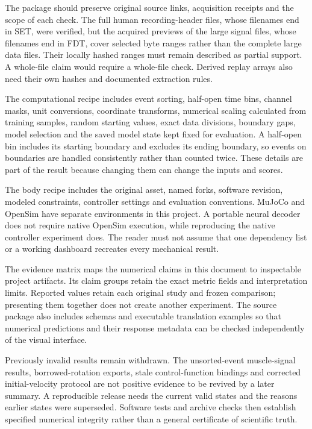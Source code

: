 The package should preserve original source links, acquisition receipts and the scope of each check. The full human recording-header files, whose filenames end in SET, were verified, but the acquired previews of the large signal files, whose filenames end in FDT, cover selected byte ranges rather than the complete large data files. Their locally hashed ranges must remain described as partial support. A whole-file claim would require a whole-file check. Derived replay arrays also need their own hashes and documented extraction rules.\cite{spinal_dataset2023,spinal_companion2023}

The computational recipe includes event sorting, half-open time bins, channel masks, unit conversions, coordinate transforms, numerical scaling calculated from training samples, random starting values, exact data divisions, boundary gaps, model selection and the saved model state kept fixed for evaluation. A half-open bin includes its starting boundary and excludes its ending boundary, so events on boundaries are handled consistently rather than counted twice. These details are part of the result because changing them can change the inputs and scores.

The body recipe includes the original asset, named forks, software revision, modeled constraints, controller settings and evaluation conventions. MuJoCo and OpenSim have separate environments in this project. A portable neural decoder does not require native OpenSim execution, while reproducing the native controller experiment does. The reader must not assume that one dependency list or a working dashboard recreates every mechanical result.\cite{mujoco2012,opensim2018,myosim2026,limblabmodel2026}

The evidence matrix maps the numerical claims in this document to inspectable project artifacts. Its claim groups retain the exact metric fields and interpretation limits. Reported values retain each original study and frozen comparison; presenting them together does not create another experiment. The source package also includes schemas and executable translation examples so that numerical predictions and their response metadata can be checked independently of the visual interface.

Previously invalid results remain withdrawn. The unsorted-event muscle-signal results, borrowed-rotation exports, stale control-function bindings and corrected initial-velocity protocol are not positive evidence to be revived by a later summary. A reproducible release needs the current valid states and the reasons earlier states were superseded. Software tests and archive checks then establish specified numerical integrity rather than a general certificate of scientific truth.

